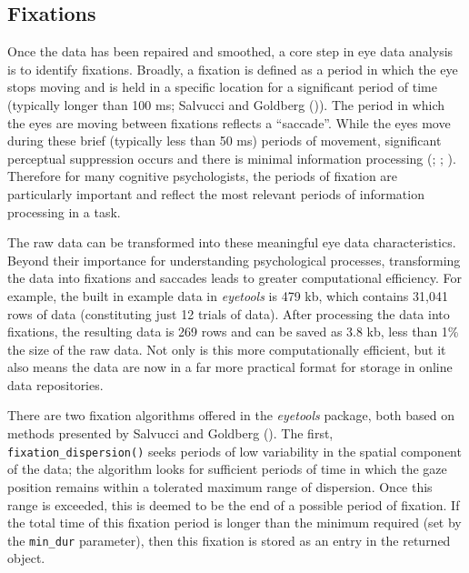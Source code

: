 \documentclass[
  man,
  floatsintext,
  longtable,
  nolmodern,
  notxfonts,
  notimes,
  colorlinks=true,linkcolor=blue,citecolor=blue,urlcolor=blue]{apa7}
\begin{document}
\subsection{Fixations}\label{fixations}

Once the data has been repaired and smoothed, a core step in eye data
analysis is to identify fixations. Broadly, a fixation is defined as a
period in which the eye stops moving and is held in a specific location
for a significant period of time (typically longer than 100 ms; Salvucci
and Goldberg ()). The period in which
the eyes are moving between fixations reflects a ``saccade''. While the
eyes move during these brief (typically less than 50 ms) periods of
movement, significant perceptual suppression occurs and there is minimal
information processing (; ;
). Therefore for
many cognitive psychologists, the periods of fixation are particularly
important and reflect the most relevant periods of information
processing in a task.

The raw data can be transformed into these meaningful eye data
characteristics. Beyond their importance for understanding psychological
processes, transforming the data into fixations and saccades leads to
greater computational efficiency. For example, the built in example data
in \emph{eyetools} is 479 kb, which contains 31,041 rows of data
(constituting just 12 trials of data). After processing the data into
fixations, the resulting data is 269 rows and can be saved as 3.8 kb,
less than 1\% the size of the raw data. Not only is this more
computationally efficient, but it also means the data are now in a far
more practical format for storage in online data repositories.

There are two fixation algorithms offered in the \emph{eyetools}
package, both based on methods presented by Salvucci and Goldberg
(). The first,
\texttt{fixation\_dispersion()} seeks periods of low variability in the
spatial component of the data; the algorithm looks for sufficient
periods of time in which the gaze position remains within a tolerated
maximum range of dispersion. Once this range is exceeded, this is deemed
to be the end of a possible period of fixation. If the total time of
this fixation period is longer than the minimum required (set by the
\texttt{min\_dur} parameter), then this fixation is stored as an entry
in the returned object.
\end{document}
